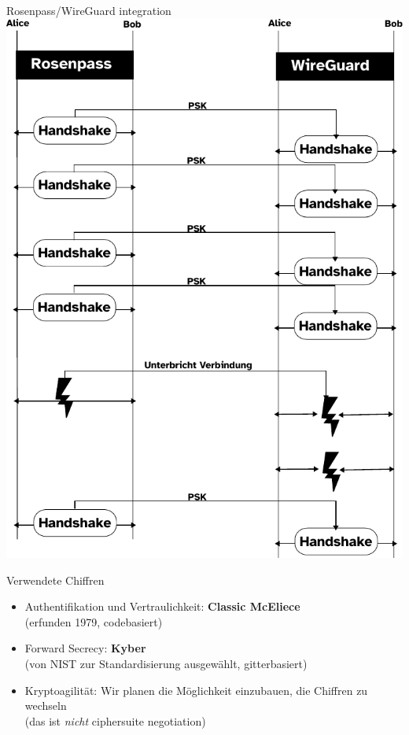 \documentclass{rosenpass-beamer}
\begin{document}
\begin{frame}{Rosenpass/WireGuard integration}
  \includegraphics[height=.9\textheight]{graphics/rpwg.pdf}
\end{frame}

\begin{frame}{Verwendete Chiffren}
  \begin{itemize}
    \item Authentifikation und Vertraulichkeit: \textbf{Classic McEliece}\\
	    (erfunden 1979, codebasiert)
    \item Forward Secrecy: \textbf{Kyber}\\
	    (von NIST zur Standardisierung ausgewählt, gitterbasiert)
    \item Kryptoagilität: Wir planen die Möglichkeit einzubauen, die Chiffren zu wechseln\\
	    (das ist \emph{nicht} ciphersuite negotiation)
  \end{itemize}
\end{frame}
\end{document}
